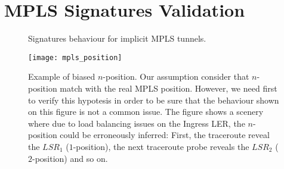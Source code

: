 \section{MPLS Signatures Validation}\label{validation}

\begin{figure}[!t]
  \begin{center}
\hspace{-0.3cm}      
  \end{center}
  \caption{Signatures behaviour for implicit MPLS tunnels.}
  \label{validation.signatures.fig}
\end{figure}







\begin{figure}[!t]
  \begin{center}
    \texttt{[image: mpls\_position]}
  \end{center}
  \caption{Example of biased $n$-position. Our assumption consider that $n$-position match with the real MPLS position. However, we need first to verify this hypotesis in order to be sure that the behaviour shown on this figure is not a common issue. The figure shows a scenery where due to load balancing issues on the Ingress LER, the $n$-position could be erroneously inferred: First, the traceroute reveal the $LSR_{1}$ ($1$-position), the next traceroute probe reveals the $LSR_{2}$ ($2$-position) and so on.}
  \label{validation.MPLSpositionFig}
\end{figure}

